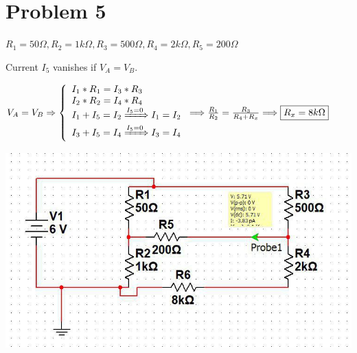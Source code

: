 \documentclass{report}
\begin{document}
    \section*{Problem 5}
    {
        $R_1 = 50\Omega, R_2 = 1k\Omega, R_3 = 500\Omega, R_4 = 2k\Omega, R_5 = 200\Omega$

        Current $I_5$ vanishes if $V_A = V_B$.

        $
            V_A = V_B
            \Rightarrow
            \left\{
                \begin{array}{l}
                    I_1 * R_1 = I_3 * R_3 \\
                    I_2 * R_2 = I_4 * R_4 \\
                    I_1 + I_5 = I_2 \xRightarrow{I_5 = 0} I_1 = I_2 \\
                    I_3 + I_5 = I_4 \xRightarrow{I_5 = 0} I_3 = I_4 \\
                \end{array}
            \right.
            \Longrightarrow
            \frac{R_1}{R_2} = \frac{R_3}{R_4 + R_x}
            \Longrightarrow
            \boxed{R_x = 8k\Omega}
        $

        \begin{center}
            \includegraphics[width=0.5\linewidth]{problem5.jpg}
        \end{center}

    }
\end{document}
